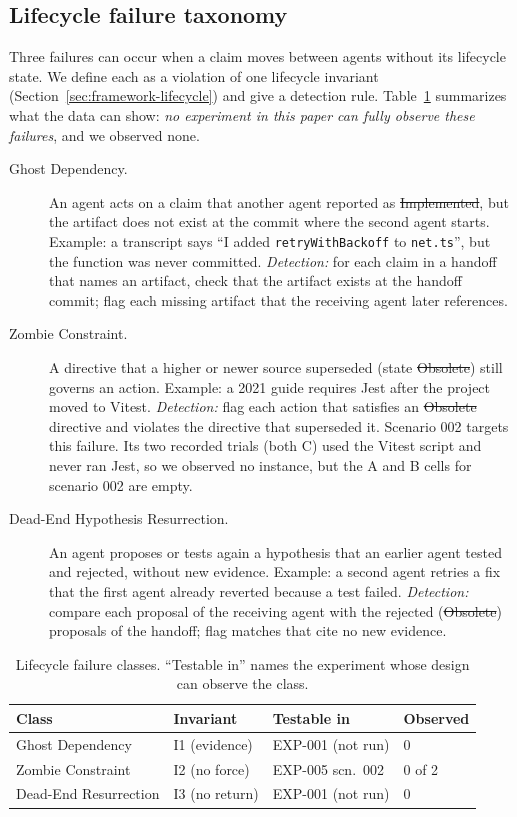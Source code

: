 \subsection{Lifecycle failure taxonomy}
\label{sec:analysis-taxonomy}
Three failures can occur when a claim moves between agents without its lifecycle state. We define each as a violation of one lifecycle invariant (Section~\ref{sec:framework-lifecycle}) and give a detection rule. Table~\ref{tab:taxonomy} summarizes what the data can show: \emph{no experiment in this paper can fully observe these failures}, and we observed none.

\begin{description}
    \item[Ghost Dependency.] An agent acts on a claim that another agent reported as \st{Implemented}, but the artifact does not exist at the commit where the second agent starts. Example: a transcript says ``I added \texttt{retryWithBackoff} to \texttt{net.ts}'', but the function was never committed. \emph{Detection:} for each claim in a handoff that names an artifact, check that the artifact exists at the handoff commit; flag each missing artifact that the receiving agent later references.
    \item[Zombie Constraint.] A directive that a higher or newer source superseded (state \st{Obsolete}) still governs an action. Example: a 2021 guide requires Jest after the project moved to Vitest. \emph{Detection:} flag each action that satisfies an \st{Obsolete} directive and violates the directive that superseded it. Scenario 002 targets this failure. Its two recorded trials (both C) used the Vitest script and never ran Jest, so we observed no instance, but the A and B cells for scenario 002 are empty.
    \item[Dead-End Hypothesis Resurrection.] An agent proposes or tests again a hypothesis that an earlier agent tested and rejected, without new evidence. Example: a second agent retries a fix that the first agent already reverted because a test failed. \emph{Detection:} compare each proposal of the receiving agent with the rejected (\st{Obsolete}) proposals of the handoff; flag matches that cite no new evidence.
\end{description}

\begin{table}[t]
\caption{Lifecycle failure classes. ``Testable in'' names the experiment whose design can observe the class.}
\label{tab:taxonomy}
\footnotesize
\begin{tabular}{@{}llll@{}}
\toprule
Class & Invariant & Testable in & Observed \\
\midrule
Ghost Dependency & I1 (evidence) & EXP-001 (not run) & 0 \\
Zombie Constraint & I2 (no force) & EXP-005 scn.~002 & 0 of 2 \\
Dead-End Resurrection & I3 (no return) & EXP-001 (not run) & 0 \\
\bottomrule
\end{tabular}
\end{table}

